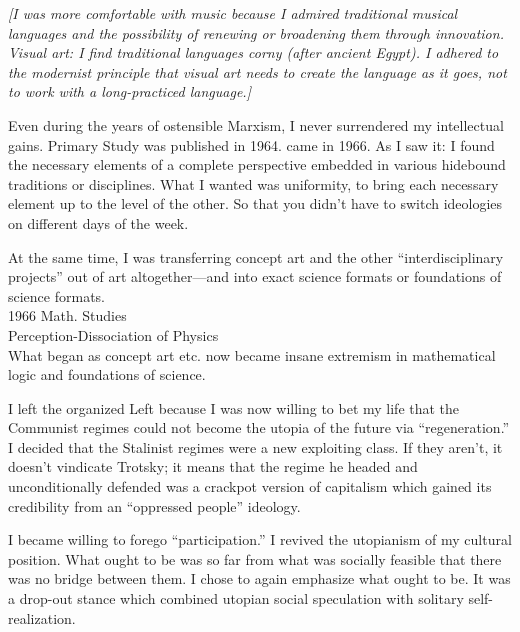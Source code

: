 {\itshape\footnotesize [I was more comfortable with music because I admired traditional musical languages and the possibility of renewing or broadening them through innovation.  Visual art:  I find traditional languages corny (after ancient Egypt).  I adhered to the modernist principle that visual art needs to create the language as it goes, not to work with a long-practiced language.]\par}

\Pb 

Even during the years of ostensible Marxism, I never surrendered my intellectual gains.  Primary Study was published in 1964.  came in 1966.  As I saw it:  I found the necessary elements of a complete perspective embedded in various hidebound traditions or disciplines.  What I wanted was uniformity, to bring each necessary element up to the level of the other.  So that you didn't have to switch ideologies on different days of the week. 

At the same time, I was transferring concept art and the other \enquote{interdisciplinary projects} out of art altogether---and into exact science formats or foundations of science formats. \\
1966 Math. Studies \\
Perception-Dissociation of Physics \\

What began as concept art etc. now became insane extremism in mathematical logic and foundations of science.


I left the organized Left because I was now willing to bet my life that the Communist regimes could not become the utopia of the future via \enquote{regeneration.}  I decided that the Stalinist regimes were a new exploiting class.  If they aren't, it doesn't vindicate Trotsky; it means that the regime he headed and unconditionally defended was a crackpot version of capitalism which gained its credibility from an \enquote{oppressed people} ideology. 

I became willing to forego \enquote{participation.}  I revived the utopianism of my cultural position.  What ought to be was so far from what was socially feasible that there was no bridge between them.  I chose to again emphasize what ought to be.  It was a drop-out stance which combined utopian social speculation with solitary self-realization.

